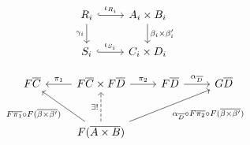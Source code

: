 \documentclass{lmcs}
\theoremstyle{plain}\newtheorem{satz}[thm]{Satz}
\begin{document}
{\begin{minipage}[b]{0.25\linewidth}
{\small    \[
    \begin{tikzcd}
        R_i
        \ar[d, "{\gamma_i}"']
        \ar[r, hookrightarrow, "{\iota_{R_i}}"]
        &A_i \times B_i
        \ar[d, "{\beta_i \times \beta'_i}"] \\
        S_i
        \ar[r, hookrightarrow, "{\iota_{S_i}}"]
        &C_i \times D_i
    \end{tikzcd}
    \]}
\end{minipage}
\begin{minipage}[b]{0.25\linewidth}
{\footnotesize \[
      \begin{tikzcd}[row sep = large]
          F\overline{C}
          &F\overline{C} \times F\overline{D}
          \ar[l, "{\pi_1}"'] \ar[r, "{\pi_2}"]
          &F\overline{D}
          \ar[r, "{\alpha_{\ol{D}}}"]
          &G\overline{D}\\
          &F(\overline{A \times B})
          \ar[u, dashed, "{\exists !}"]
          \ar[ul, "{F\ol{\pi_1} \circ F(\overline{\beta \times \beta'})}"]
          \ar[urr, "{\alpha_{\ol{D}} \circ F\ol{\pi_2} \circ F(\overline{\beta \times \beta'})}"']
      \end{tikzcd}
      \]}
\end{minipage}


}
\end{document}
